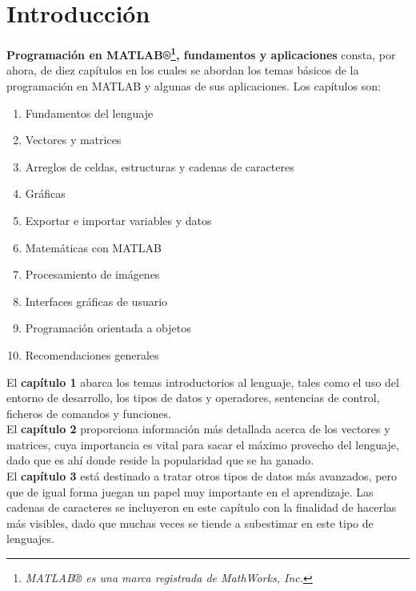 \chapter*{Introducción}


\textbf{Programación en MATLAB®\footnote{\emph{MATLAB® es una marca
  registrada de MathWorks, Inc.}}, fundamentos y aplicaciones} consta,
por ahora, de diez capítulos en los cuales se abordan los temas básicos
de la programación en MATLAB y algunas de sus aplicaciones. Los
capítulos son:

\begin{enumerate}
\def\labelenumi{\arabic{enumi}.}
\tightlist
\item
  Fundamentos del lenguaje
\item
  Vectores y matrices
\item
  Arreglos de celdas, estructuras y cadenas de caracteres
\item
  Gráficas
\item
  Exportar e importar variables y datos
\item
  Matemáticas con MATLAB
\item
  Procesamiento de imágenes
\item
  Interfaces gráficas de usuario
\item
  Programación orientada a objetos
\item
  Recomendaciones generales
\end{enumerate}

El \textbf{capítulo 1} abarca los temas introductorios al lenguaje,
tales como el uso del entorno de desarrollo, los tipos de datos y
operadores, sentencias de control, ficheros de comandos y funciones. \\

El \textbf{capítulo 2} proporciona información más detallada acerca de
los vectores y matrices, cuya importancia es vital para sacar el máximo
provecho del lenguaje, dado que es ahí donde reside la popularidad que
se ha ganado. \\

El \textbf{capítulo 3} está destinado a tratar otros tipos de datos más
avanzados, pero que de igual forma juegan un papel muy importante en el
aprendizaje. Las cadenas de caracteres se incluyeron en este capítulo
con la finalidad de hacerlas más visibles, dado que muchas veces se
tiende a subestimar en este tipo de lenguajes. \\

